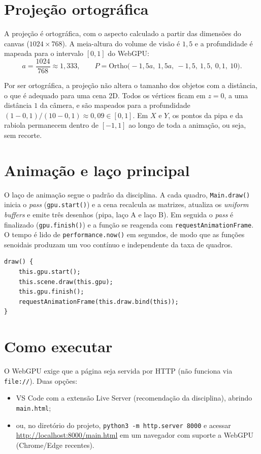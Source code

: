 \documentclass[11pt,a4paper]{article}
\newcommand{\code}[1]{\texttt{#1}}
\begin{document}
\section{Projeção ortográfica}

A projeção é ortográfica, com o aspecto calculado a partir das dimensões do
canvas ($1024\times768$). A meia-altura do volume de visão é $1{,}5$ e a
profundidade é mapeada para o intervalo $[0,1]$ do WebGPU:
\[
    a = \frac{1024}{768} \approx 1{,}333,\qquad
    P = \mathrm{Ortho}\big(-1{,}5a,\ 1{,}5a,\ -1{,}5,\ 1{,}5,\ 0{,}1,\ 10\big).
\]

Por ser ortográfica, a projeção não altera o tamanho dos objetos com a
distância, o que é adequado para uma cena 2D. Todos os vértices ficam em
$z=0$, a uma distância $1$ da câmera, e são mapeados para a profundidade
$(1-0{,}1)/(10-0{,}1) \approx 0{,}09 \in [0,1]$. Em $X$ e $Y$, os pontos da pipa e
da rabiola permanecem dentro de $[-1,1]$ ao longo de toda a animação, ou seja,
sem recorte.

\section{Animação e laço principal}

O laço de animação segue o padrão da disciplina. A cada quadro,
\code{Main.draw()} inicia o \emph{pass} (\code{gpu.start()}) e a cena
recalcula as matrizes, atualiza os \emph{uniform buffers} e emite três
desenhos (pipa, laço A e laço B). Em seguida o \emph{pass} é finalizado
(\code{gpu.finish()}) e a função se reagenda com \code{requestAnimationFrame}.
O tempo é lido de \code{performance.now()} em segundos, de modo que as funções
senoidais produzam um voo contínuo e independente da taxa de quadros.

\begin{lstlisting}
draw() {
    this.gpu.start();
    this.scene.draw(this.gpu);
    this.gpu.finish();
    requestAnimationFrame(this.draw.bind(this));
}
\end{lstlisting}

\section{Como executar}

O WebGPU exige que a página seja servida por HTTP (não funciona via
\code{file://}). Duas opções:

\begin{itemize}
    \item VS Code com a extensão Live Server (recomendação da disciplina),
          abrindo \code{main.html};
    \item ou, no diretório do projeto, \code{python3 -m http.server 8000} e
          acessar \url{http://localhost:8000/main.html} em um navegador com
          suporte a WebGPU (Chrome/Edge recentes).
\end{itemize}
\end{document}
